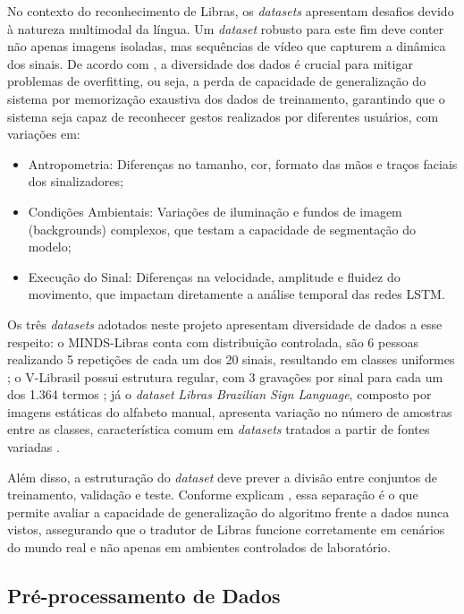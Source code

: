 \documentclass[
    12pt,                %
    openright,           %
    oneside,             %
    a4paper,             %
    english,             %
    brazil               %
]{abntex2}
\begin{document}
No contexto do reconhecimento de Libras, os \textit{datasets} apresentam desafios devido à natureza multimodal da língua. Um \textit{dataset} robusto para este fim deve conter não apenas imagens isoladas, mas sequências de vídeo que capturem a dinâmica dos sinais. De acordo com , a diversidade dos dados é crucial para mitigar problemas de overfitting, ou seja, a perda de capacidade de generalização do sistema por memorização exaustiva dos dados de treinamento, garantindo que o sistema seja capaz de reconhecer gestos realizados por diferentes usuários, com variações em:

\begin{itemize}
    \item {Antropometria:} Diferenças no tamanho, cor, formato das mãos e traços faciais dos sinalizadores;
    \item {Condições Ambientais:} Variações de iluminação e fundos de imagem (backgrounds) complexos, que testam a capacidade de segmentação do modelo;
    \item {Execução do Sinal:} Diferenças na velocidade, amplitude e fluidez do movimento, que impactam diretamente a análise temporal das redes LSTM.
\end{itemize}

Os três \textit{datasets} adotados neste projeto apresentam diversidade de dados a esse respeito: o MINDS-Libras conta com distribuição controlada, são 6 pessoas realizando 5 repetições de cada um dos 20 sinais, resultando em classes uniformes \cite{Rezende2021}; o V-Librasil possui estrutura regular, com 3 gravações por sinal para cada um dos 1.364 termos \cite{Rodrigues2021}; já o \textit{dataset} \textit{Libras Brazilian Sign Language}, composto por imagens estáticas do alfabeto manual, apresenta variação no número de amostras entre as classes, característica comum em \textit{datasets} tratados a partir de fontes variadas \cite{Pas2020}. 

Além disso, a estruturação do \textit{dataset} deve prever a divisão entre conjuntos de treinamento, validação e teste. Conforme explicam , essa separação é o que permite avaliar a capacidade de generalização do algoritmo frente a dados nunca vistos, assegurando que o tradutor de Libras funcione corretamente em cenários do mundo real e não apenas em ambientes controlados de laboratório.

\subsection{Pré-processamento de Dados}
\end{document}
